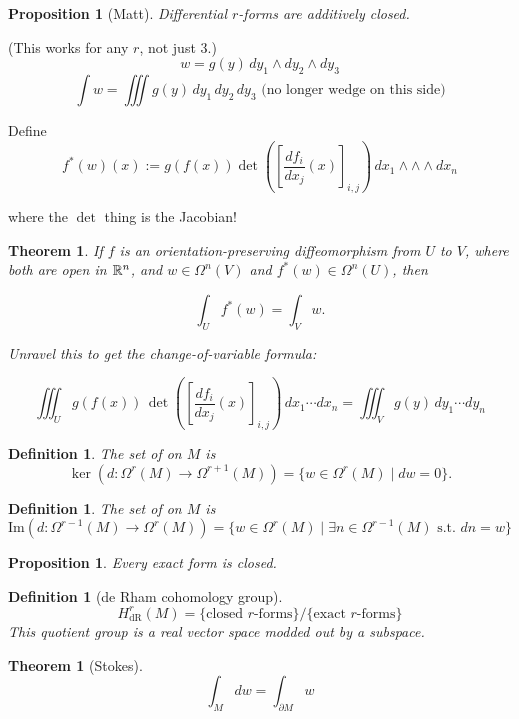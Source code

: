 \documentclass[11pt]{amsbook}
\theoremstyle{mystyle} %
\newtheorem{thrm}[thm]{Theorem}
\newtheorem{defi}[thm]{Definition}
\newtheorem{propo}[thm]{Proposition}
\numberwithin{thm}{section}
\begin{document}
\begin{propo}[Matt]
	Differential $r$-forms are additively closed.
\end{propo}

\begin{example}[integration]	%
	(This works for any $r$, not just 3.)
	$$w = g(y) \,dy_1  \wedge  dy_2  \wedge  dy_3$$	%
	$$\int w = \iiint g(y) \,dy_1 \,dy_2 \,dy_3 \text{ (no longer wedge on this side)}$$	%

	Define
	$$f^*(w)(x) := g(f(x)) \det\left(\left[\frac{df_i}{dx_j}(x)\right]_{i,j}\right) \,dx_1  \wedge  \wedge  \wedge  dx_n$$

	where the $\det$ thing is the Jacobian!
\end{example}

\begin{thrm}
	If $f$ is an orientation-preserving diffeomorphism from $U$ to $V$, where both are open in ${\mathbb R}^n$,
	and $w \in \Omega^n(V)$ and
	$f^*(w) \in \Omega^n(U)$,
	then

	$$\int_U f^*(w) = \int_V w.$$

	Unravel this to get the change-of-variable formula:

	$$\iiint_U g(f(x)) \,\det\left(\left[\frac{df_i}{dx_j}(x)\right]_{i,j}\right) \,dx_1 \cdots dx_n = \iiint_V g(y) \,dy_1 \cdots dy_n$$
\end{thrm}

\begin{defi}
	The set of  on $M$ is $$ \ker(d: \Omega^r(M) \to \Omega^{r+1}(M) ) = \{ w \in \Omega^r(M) \mid dw = 0 \}.  $$
\end{defi}

\begin{defi}
	The set of  on $M$ is $$ \text{Im}(d: \Omega^{r-1}(M) \to \Omega^r(M) ) = \{ w \in \Omega^r(M) \mid \exists n \in \Omega^{r-1}(M) \text{ s.t. } dn = w \}  $$
\end{defi}

\begin{propo}
	Every exact form is closed.
\end{propo}

\begin{defi}[de Rham cohomology group]
	$$H^r_\text{dR}(M) = \text{\{closed $r$-forms\}/\{exact $r$-forms\}}$$ %
	This quotient group is a real vector space modded out by a subspace.
\end{defi}

\begin{thrm}[Stokes]
	$$\int_M dw = \int_{\partial M} w$$
\end{thrm}
\end{document}

